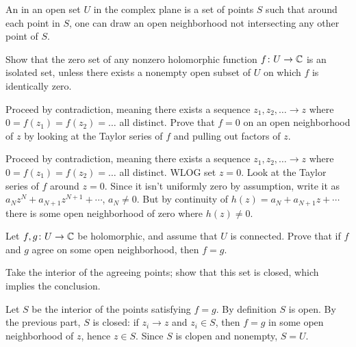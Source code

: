 \begin{sproblem}
	An  in an open set $U$ in the complex plane is a
	set of points $S$ such that around each point in $S$,
	one can draw an open neighborhood not intersecting any other point of $S$.

	Show that the zero set of any nonzero holomorphic
	function $f \colon U \to \mathbb C$ is an isolated set,
	unless there exists a nonempty open subset of $U$
	on which $f$ is identically zero.
	\begin{hint}
		Proceed by contradiction,
		meaning there exists a sequence $z_1, z_2, \dotsc \to z$
		where $0 = f(z_1) = f(z_2) = \dots$ all distinct.
		Prove that $f = 0$ on an open neighborhood of $z$
		by looking at the Taylor series of $f$ and
		pulling out factors of $z$.
	\end{hint}
	\begin{sol}
		Proceed by contradiction, meaning there exists a sequence $z_1, z_2, \dotsc \to z$
		where $0 = f(z_1) = f(z_2) = \dots$ all distinct.
		WLOG set $z=0$.
		Look at the Taylor series of $f$ around $z=0$.
		Since it isn't uniformly zero by assumption,
		write it as $a_N z^N + a_{N+1}z^{N+1} + \cdots$, $a_N \neq 0$.
		But by continuity of $h(z) = a_N + a_{N+1}z + \cdots$ there is some
		open neighborhood of zero where $h(z) \neq 0$.
	\end{sol}
\end{sproblem}

\begin{sproblem}
	\label{prob:identity_thm}
	\gim
	Let $f, g \colon U \to \mathbb C$ be holomorphic, and assume that $U$ is connected.
	Prove that if $f$ and $g$ agree on some open neighborhood,
	then $f = g$.
	\begin{hint}
		Take the interior of the agreeing points;
		show that this set is closed, which implies the conclusion.
	\end{hint}
	\begin{sol}
		Let $S$ be the interior of the points satisfying $f=g$.
		By definition $S$ is open.
		By the previous part, $S$ is closed: if $z_i \to z$ and $z_i \in S$,
		then $f=g$ in some open neighborhood of $z$, hence $z \in S$.
		Since $S$ is clopen and nonempty, $S = U$.
	\end{sol}
\end{sproblem}


